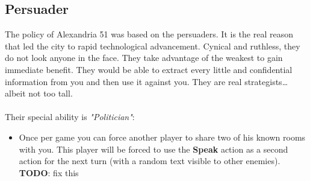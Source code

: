 \subsection{Persuader}


The policy of Alexandria 51 was based on the persuaders. It is the real reason that led the city to rapid technological advancement. Cynical and ruthless, they do not look anyone in the face. They take advantage of the weakest to gain immediate benefit. They would be able to extract every little and confidential information from you and then use it against you. They are real strategists… albeit not too tall.\\\\
Their special ability is \textit{"Politician"}:
\begin{itemize}
\item Once per game you can force another player to share two of his known rooms with you. This player will be forced to use the \textbf{Speak} action as a second action for the next turn (with a random text visible to other enemies). \textbf{TODO}: fix this
\end{itemize}

